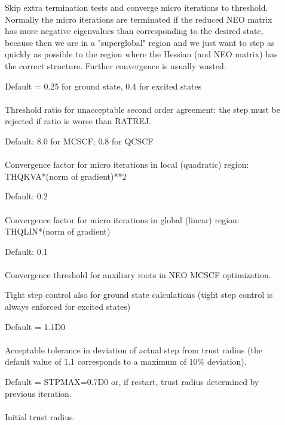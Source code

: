 \begin{description}
\item[]
  Skip extra termination tests and converge micro iterations to
  threshold.   Normally the micro iterations are terminated if the
  reduced NEO matrix has more negative eigenvalues than corresponding
  to the desired state, because then we are in a "superglobal" region
  and we just want to step as quickly as possible to the region where
  the Hessian (and NEO matrix) has the correct structure.  Further
  convergence is usually wasted.

\item[]
  Default = 0.25 for ground state, 0.4 for excited states\\
   \\
  Threshold ratio for unacceptable second order agreement: the step
  must be rejected if ratio is worse than RATREJ.

\item[]
  Default: 8.0 for MCSCF; 0.8 for QCSCF\\
   \\
  Convergence factor for micro iterations in local (quadratic) region:
  THQKVA*(norm of gradient)**2

\item[]
  Default: 0.2\\
   \\
  Convergence factor for micro iterations in global (linear) region: \\
  THQLIN*(norm of gradient)

\item[]
  Default: 0.1\\
   \\
  Convergence threshold for auxiliary roots in NEO MCSCF optimization.

\item[]
  Tight step control also for ground state calculations
  (tight step control is always enforced for excited states)

\item[]
  Default = 1.1D0\\
   \\
  Acceptable tolerance in deviation of actual step from trust radius
  (the default value of 1.1 corresponds to a maximum of 10\% deviation).

\item[]
  Default = STPMAX=0.7D0 or, if restart, trust radius determined by previous
            iteration.\\
   \\
  Initial trust radius.

\end{description}


